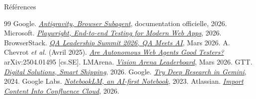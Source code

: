 \begin{frame}[allowframebreaks]{Références}
  \footnotesize
  \begin{thebibliography}{99}
      Google. \href{https://antigravity.google/docs/browser-subagent}{\emph{Antigravity, Browser Subagent}}, documentation officielle, 2026.
      Microsoft. \href{https://playwright.dev}{\emph{Playwright, End-to-end Testing for Modern Web Apps}}, 2026.
      BrowserStack. \href{https://www.browserstack.com/events}{\emph{QA Leadership Summit 2026, QA Meets AI}}, Mars 2026.
      A. Chevrot \emph{et al.} (Avril 2025).
      \newblock \href{https://arxiv.org/abs/2504.01495}{\emph{Are Autonomous Web Agents Good Testers?}}
      \newblock arXiv:2504.01495 [cs.SE].
      LMArena. \href{https://lmarena.ai/leaderboard}{\emph{Vision Arena Leaderboard}}, Mars 2026.
      GTT. \href{https://www.gtt.fr/digital-solutions}{\emph{Digital Solutions, Smart Shipping}}, 2026.
      Google. \href{https://blog.google/products/gemini/google-gemini-deep-research/}{\emph{Try Deep Research in Gemini}}, 2024.
      Google Labs. \href{https://blog.google/technology/ai/notebooklm-google-ai/}{\emph{NotebookLM, an AI-first Notebook}}, 2023.
      Atlassian. \href{https://support.atlassian.com/confluence-cloud/docs/import-content-into-confluence-cloud/}{\emph{Import Content Into Confluence Cloud}}, 2026.
  \end{thebibliography}
\end{frame}
